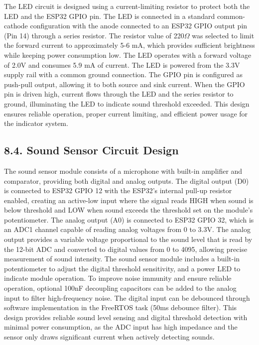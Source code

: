 \documentclass[12pt]{article}
\begin{document}
The LED circuit is designed using a current-limiting resistor to protect both the LED and the ESP32 GPIO pin. The LED is connected in a standard common-cathode configuration with the anode connected to an ESP32 GPIO output pin (Pin 14) through a series resistor. The resistor value of 220$\Omega$ was selected to limit the forward current to approximately 5-6 mA, which provides sufficient brightness while keeping power consumption low. The LED operates with a forward voltage of 2.0V and consumes 5.9 mA of current. The LED is powered from the 3.3V supply rail with a common ground connection. The GPIO pin is configured as push-pull output, allowing it to both source and sink current. When the GPIO pin is driven high, current flows through the LED and the series resistor to ground, illuminating the LED to indicate sound threshold exceeded. This design ensures reliable operation, proper current limiting, and efficient power usage for the indicator system.

\subsection*{8.4. Sound Sensor Circuit Design}

The sound sensor module consists of a microphone with built-in amplifier and comparator, providing both digital and analog outputs. The digital output (D0) is connected to ESP32 GPIO 12 with the ESP32's internal pull-up resistor enabled, creating an active-low input where the signal reads HIGH when sound is below threshold and LOW when sound exceeds the threshold set on the module's potentiometer. The analog output (A0) is connected to ESP32 GPIO 32, which is an ADC1 channel capable of reading analog voltages from 0 to 3.3V. The analog output provides a variable voltage proportional to the sound level that is read by the 12-bit ADC and converted to digital values from 0 to 4095, allowing precise measurement of sound intensity. The sound sensor module includes a built-in potentiometer to adjust the digital threshold sensitivity, and a power LED to indicate module operation. To improve noise immunity and ensure reliable operation, optional 100nF decoupling capacitors can be added to the analog input to filter high-frequency noise. The digital input can be debounced through software implementation in the FreeRTOS task (50ms debounce filter). This design provides reliable sound level sensing and digital threshold detection with minimal power consumption, as the ADC input has high impedance and the sensor only draws significant current when actively detecting sounds.
\end{document}
